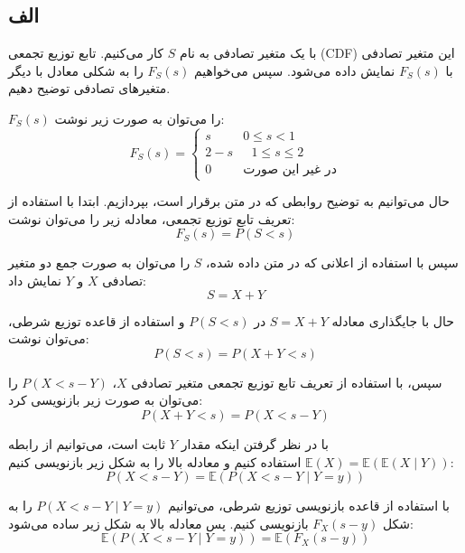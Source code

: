\subsection*{الف}

با یک متغیر تصادفی به نام $S$ کار می‌کنیم. تابع توزیع تجمعی (CDF) این متغیر تصادفی با $F_S(s)$ نمایش داده می‌شود. سپس می‌خواهیم $F_S(s)$ را به شکلی معادل با دیگر متغیرهای تصادفی توضیح دهیم.

$F_S(s)$
را می‌توان به صورت زیر نوشت:
\begin{equation*}
	F_S(s) =
	\begin{cases}
		s & \text{} 0 \le s < 1 \\
		2 - s & \text{ } 1 \le s \le 2 \\
		0 & \text{در غیر این صورت}
	\end{cases}
\end{equation*}

حال می‌توانیم به توضیح روابطی که در متن برقرار است، بپردازیم. ابتدا با استفاده از تعریف تابع توزیع تجمعی، معادله زیر را می‌توان نوشت:
\begin{equation*}
	F_S(s) = P(S < s)
\end{equation*}

سپس با استفاده از اعلانی که در متن داده شده، $S$ را می‌توان به صورت جمع دو متغیر تصادفی $X$ و $Y$ نمایش داد:
\begin{equation*}
	S = X + Y
\end{equation*}

حال با جایگذاری معادله $S = X + Y$ در $P(S < s)$ و استفاده از قاعده توزیع شرطی، می‌توان نوشت:
\begin{equation*}
	P(S < s) = P(X + Y < s)
\end{equation*}

سپس، با استفاده از تعریف تابع توزیع تجمعی متغیر تصادفی $X$، $P(X < s - Y)$ را می‌توان به صورت زیر بازنویسی کرد:
\begin{equation*}
	P(X + Y < s) = P(X < s - Y)
\end{equation*}

با در نظر گرفتن اینکه مقدار $Y$ ثابت است، می‌توانیم از رابطه $\mathbb{E}(X) = \mathbb{E}(\mathbb{E}(X \mid Y))$ استفاده کنیم و معادله بالا را به شکل زیر بازنویسی کنیم:
\begin{equation*}
	P(X < s - Y) = \mathbb{E}(P(X < s - Y \mid Y = y))
\end{equation*}

با استفاده از قاعده بازنویسی توزیع شرطی، می‌توانیم $P(X < s - Y \mid Y = y)$ را به شکل $F_X(s - y)$ بازنویسی کنیم. پس معادله بالا به شکل زیر ساده می‌شود:
\begin{equation*}
	\mathbb{E}(P(X < s - Y \mid Y = y)) = \mathbb{E}(F_X(s - y))
\end{equation*}

